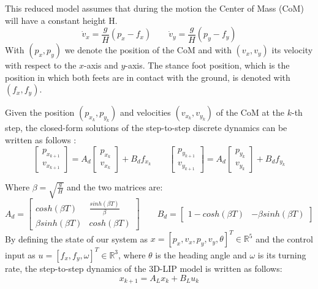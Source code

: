 This reduced model assumes that during the motion the Center of Mass (CoM) will have a constant height H.
\begin{equation}
    \dot{v}_{x} = \frac{g}{H}(p_{x} - f_{x})
    \qquad
    \dot{v}_{y} = \frac{g}{H}(p_{y} - f_{y})
\end{equation}
With $(p_{x}, p_{y})$ we denote the position of the CoM and with $(v_{x}, v_{y})$ its velocity with respect to the $x$-axis and $y$-axis. The stance foot position, which is the position in which both feets are in contact with the ground, is denoted with $(f_{x}, f_{y})$.

Given the position $(p_{x_{k}}, p_{y_{k}})$ and velocities $(v_{x_{k}}, v_{y_{k}})$ of the CoM at the $k$-th step, the closed-form solutions of the step-to-step discrete dynamics can be written as follows :
\begin{equation}
    \begin{bmatrix}
        p_{x_{k+1}} \\
        v_{x_{k+1}}
    \end{bmatrix}
    = A_{d}
    \begin{bmatrix}
        p_{x_{k}} \\
        v_{x_{k}}
    \end{bmatrix}
    + B_{d} f_{x_{k}}
    \qquad
    \begin{bmatrix}
        p_{y_{k+1}} \\
        v_{y_{k+1}}
    \end{bmatrix}
    = A_{d}
    \begin{bmatrix}
        p_{y_{k}} \\
        v_{y_{k}}
    \end{bmatrix}
    + B_{d} f_{y_{k}}
\end{equation}

Where $\beta = \sqrt{\frac{g}{H}}$ and the two matrices are:
\begin{equation}
    A_{d} = 
    \begin{bmatrix}
        cosh(\beta T) & \frac{sinh(\beta T)}{\beta} \\
        \beta sinh(\beta T) & cosh(\beta T)
    \end{bmatrix}
    \qquad
    B_{d} = 
    \begin{bmatrix}
        1 - cosh(\beta T) & - \beta sinh(\beta T)
    \end{bmatrix}
\end{equation}
By defining the state of our system as $x = [p_{x}, v_{x}, p_{y}, v_{y}, \theta]^T \in \mathbb{R}^5$ and the control input as $u = [f_{x}, f_{y}, \omega]^T \in \mathbb{R}^3$, where $\theta$ is the heading angle and $\omega$ is its turning rate, the step-to-step dynamics of the 3D-LIP model is written as follows:
\begin{equation}
    x_{k+1} = A_{L}x_{k} + B_{L}u_{k}
\end{equation}


